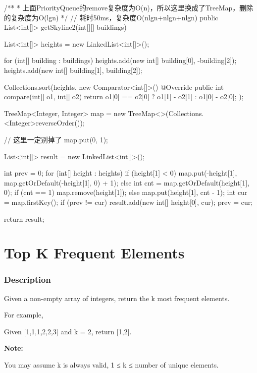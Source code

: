 \begin{Code}
/**
 * 上面PriorityQueue的remove复杂度为O(n)，所以这里换成了TreeMap，删除的复杂度为O(lgn)
 */
// 耗时50ms，复杂度O(nlgn+nlgn+nlgn)
public List<int[]> getSkyline2(int[][] buildings) {
    List<int[]> heights = new LinkedList<int[]>();

    for (int[] building : buildings) {
        heights.add(new int[] {building[0], -building[2]});
        heights.add(new int[] {building[1], building[2]});
    }

    Collections.sort(heights, new Comparator<int[]>() {
        @Override
        public int compare(int[] o1, int[] o2) {
            return o1[0] == o2[0] ? o1[1] - o2[1] : o1[0] - o2[0];
        }
    });

    TreeMap<Integer, Integer> map = new TreeMap<>(Collections.<Integer>reverseOrder());

    // 这里一定别掉了
    map.put(0, 1);

    List<int[]> result = new LinkedList<int[]>();

    int prev = 0;
    for (int[] height : heights) {
        if (height[1] < 0) {
            map.put(-height[1], map.getOrDefault(-height[1], 0) + 1);
        } else {
            int cnt = map.getOrDefault(height[1], 0);
            if (cnt == 1) {
                map.remove(height[1]);
            } else {
                map.put(height[1], cnt - 1);
            }
        }
        int cur = map.firstKey();
        if (prev != cur) {
            result.add(new int[] {height[0], cur});
            prev = cur;
        }
    }

    return result;
}
\end{Code}

\newpage


\section{Top K Frequent Elements} %

\subsubsection{Description}
Given a non-empty array of integers, return the k most frequent elements.

For example,

Given [1,1,1,2,2,3] and k = 2, return [1,2].

\textbf{Note:}

You may assume k is always valid, 1 ≤ k ≤ number of unique elements.

